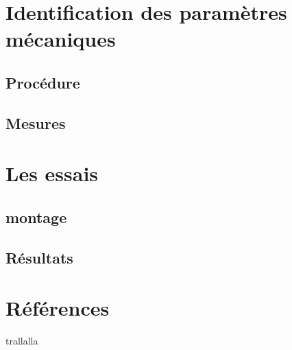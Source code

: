 \documentclass[12pt]{report}
\begin{document}
\chapter{Identification des paramètres mécaniques
}
\section{Procédure}


\section{Mesures}


\chapter{Les essais}
\section{montage}


\section{Résultats}


\chapter*{Références}
trallalla
\end{document}
